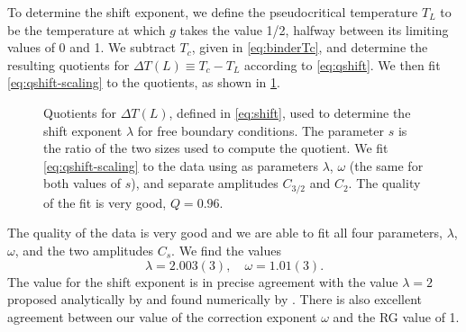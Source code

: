 To determine the shift exponent, we define the pseudocritical temperature $T_L$
to be the temperature at which $g$ takes the value 1/2, halfway between its
limiting values of 0 and 1. We subtract $T_c$, given in \cref{eq:binderTc},
and determine the resulting quotients for $\Delta T(L) \equiv T_c - T_L$
according to \cref{eq:qshift}. We then fit \cref{eq:qshift-scaling}
to the quotients, as shown in \cref{fig:qshift}.
\begin{figure}
  \centering
  
  \caption[
    Quotient estimation of the shift exponent $\lambda$ for the
    five-dimensional Ising model with free boundary conditions.
  ]
  {
    Quotients for $\Delta T(L)$, defined in \cref{eq:shift}, used to
    determine the shift exponent $\lambda$ for free boundary conditions. The
    parameter $s$ is the ratio of the two sizes used to compute the quotient.
    We fit \cref{eq:qshift-scaling} to the data using as parameters $\lambda$,
    $\omega$ (the same for both values of $s$), and separate amplitudes
    $C_{3/2}$ and $C_2$. The quality of the fit is very good, $Q=0.96$.
  } \label{fig:qshift}
\end{figure}
The quality of the data is very good and we are able to fit all four
parameters, $\lambda$, $\omega$, and the two amplitudes $C_s$. We find the
values
\begin{equation}
  \lambda = 2.003(3),\quad
  \omega = 1.01(3).
\end{equation}
The value for the shift exponent is in precise agreement with the value
$\lambda=2$ proposed analytically by \textcite{rudnick1985effect} and found
numerically by \textcite{berche2012hyperscaling}. There is also excellent
agreement between our value of the correction exponent $\omega$ and the RG
value of 1.

